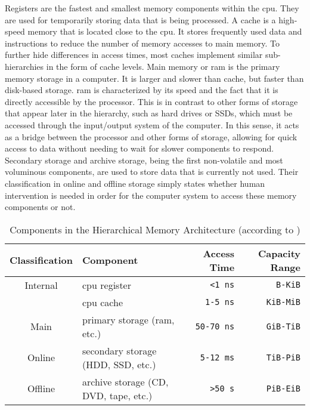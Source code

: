 Registers are the fastest and smallest memory components within the \ac{cpu}.
They are used for temporarily storing data that is being processed.
A cache is a high-speed memory that is located close to the \ac{cpu}.
It stores frequently used data and instructions to reduce the number of memory accesses to main memory.
To further hide differences in access times, most caches implement similar sub-hierarchies in the form of cache levels.
Main memory or \acf{ram} is the primary memory storage in a computer.
It is larger and slower than cache, but faster than disk-based storage.
\Ac{ram} is characterized by its speed and the fact that it is directly accessible by the processor.
This is in contrast to other forms of storage that appear later in the hierarchy, such as hard drives or SSDs, which must be accessed through the input/output system of the computer.
In this sense, it acts as a bridge between the processor and other forms of storage, allowing for quick access to data without needing to wait for slower components to respond.
Secondary storage and archive storage, being the first non-volatile and most voluminous components, are used to store data that is currently not used.
Their classification in online and offline storage simply states whether human intervention is needed in order for the computer system to access these memory components or not.

\begin{table}
  \centering
  \begin{tabular}{|c|l|r|r|}
    \hline
    \textbf{Classification} & \textbf{Component} & \textbf{Access Time} & \textbf{Capacity Range} \\
    \hline
    Internal & \acs{cpu} register                    & \texttt{<1 ns}    & \texttt{B-KiB}\\
             & \acs{cpu} cache                       & \texttt{1-5 ns}   & \texttt{KiB-MiB}\\
    Main     & primary storage (\acs{ram}, etc.)     & \texttt{50-70 ns} & \texttt{GiB-TiB}\\
    Online   & secondary storage (HDD, SSD, etc.)    & \texttt{5-12 ms}  & \texttt{TiB-PiB}\\
    Offline  & archive storage (CD, DVD, tape, etc.) & \texttt{>50 s}    & \texttt{PiB-EiB}\\
    \hline
  \end{tabular}
  \caption{Components in the Hierarchical Memory Architecture (according to \cite{memory-hierarchy1994, kumar-memory-hierarchy2018})}
  \label{tab:memory-hierarchy}
\end{table}

